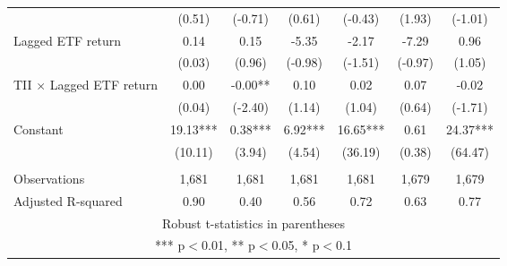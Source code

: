 \documentclass[]{article}
\begin{document}
\begin{tabular}{lcccccc}
 & (0.51) & (-0.71) & (0.61) & (-0.43) & (1.93) & (-1.01) \\
Lagged ETF return & 0.14 & 0.15 & -5.35 & -2.17 & -7.29 & 0.96 \\
 & (0.03) & (0.96) & (-0.98) & (-1.51) & (-0.97) & (1.05) \\
TII $\times$ Lagged ETF return & 0.00 & -0.00** & 0.10 & 0.02 & 0.07 & -0.02 \\
 & (0.04) & (-2.40) & (1.14) & (1.04) & (0.64) & (-1.71) \\
Constant & 19.13*** & 0.38*** & 6.92*** & 16.65*** & 0.61 & 24.37*** \\
 & (10.11) & (3.94) & (4.54) & (36.19) & (0.38) & (64.47) \\
 &  &  &  &  &  &  \\
Observations & 1,681 & 1,681 & 1,681 & 1,681 & 1,679 & 1,679 \\
 Adjusted R-squared & 0.90 & 0.40 & 0.56 & 0.72 & 0.63 & 0.77 \\ \hline
\multicolumn{7}{c}{ Robust t-statistics in parentheses} \\
\multicolumn{7}{c}{ *** p$<$0.01, ** p$<$0.05, * p$<$0.1} \\
\end{tabular}
\end{document}
